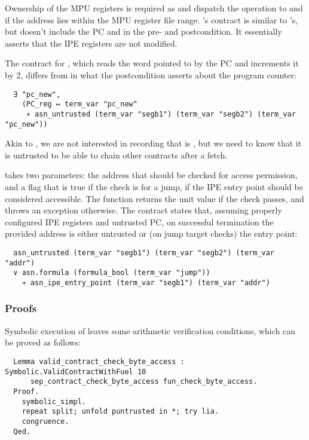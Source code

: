 Ownership of the MPU registers is required as  and  dispatch the operation to  and  if the address lies within the MPU register file range. 's contract is similar to 's, but doesn't include the PC and  in the pre- and postcondition. It essentially asserts that the IPE registers are not modified.

The contract for , which reads the word pointed to by the PC and increments it by 2, differs from  in what the postcondition asserts about the program counter:
\begin{verbatim}
  ∃ "pc_new",
    (PC_reg ↦ term_var "pc_new"
     ∗ asn_untrusted (term_var "segb1") (term_var "segb2") (term_var "pc_new"))
\end{verbatim}
Akin to , we are not interested in recording that  is , but we need to know that it is untrusted to be able to chain other contracts after a fetch.

 takes two parameters: the address that should be checked for access permission, and a flag that is true if the check is for a jump, \ie if the IPE entry point should be considered accessible. The function returns the unit value if the check passes, and throws an exception otherwise. The contract states that, assuming properly configured IPE registers and untrusted PC, on successful termination the provided address is either untrusted or (on jump target checks) the entry point:
\begin{verbatim}
  asn_untrusted (term_var "segb1") (term_var "segb2") (term_var "addr")
  ∨ asn.formula (formula_bool (term_var "jump"))
    ∗ asn_ipe_entry_point (term_var "segb1") (term_var "addr")
\end{verbatim}

\subsubsection{Proofs}

Symbolic execution of  leaves some arithmetic verification conditions, which can be proved as follows:
\begin{verbatim}
  Lemma valid_contract_check_byte_access : Symbolic.ValidContractWithFuel 10
      sep_contract_check_byte_access fun_check_byte_access.
  Proof.
    symbolic_simpl.
    repeat split; unfold puntrusted in *; try lia.
    congruence.
  Qed.
\end{verbatim}

